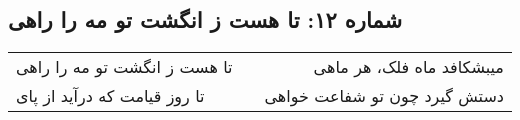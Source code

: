 \begin{center}
\section*{شماره ۱۲: تا هست ز انگشت تو مه را راهی}
\label{sec:012}
\begin{longtable}{l p{0.5cm} r}
تا هست ز انگشت تو مه را راهی
&&
میبشکافد ماه فلک، هر ماهی
\\
تا روز قیامت که درآید از پای
&&
دستش گیرد چون تو شفاعت خواهی
\\
\end{longtable}
\end{center}
